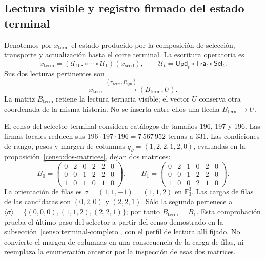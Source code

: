 



\subsection{Lectura visible y registro firmado del estado terminal}
\label{subsec:k-terminal}

Denotemos por \(x_{\mathrm{term}}\) el estado producido por la composición
de selección, transporte y actualización hasta el corte terminal. La
escritura operatoria es
\[
 x_{\mathrm{term}}=
 (\mathcal U_{108}\circ\cdots\circ\mathcal U_1)(x_{\mathrm{seed}}),
 \qquad \mathcal U_t=\mathsf{Upd}_t\circ\mathsf{Tra}_t\circ\mathsf{Sel}_t.
\]
Sus dos lecturas pertinentes son
\[
 x_{\mathrm{term}}
 \xrightarrow{(\pi_{\mathrm{term}},R_{\mathrm{sgn}})}
 (B_{\mathrm{term}},U).
\]
La matriz \(B_{\mathrm{term}}\) retiene la lectura ternaria visible; el
vector \(U\) conserva otra coordenada de la misma historia. No se inserta
entre ellos una flecha \(B_{\mathrm{term}}\to U\).

El censo del selector terminal considera catálogos
de tamaños 196, 197 y 196. Las firmas locales reducen sus
\(196\cdot197\cdot196=7\,567\,952\) ternas a 331. Las condiciones de rango,
pesos y margen de columnas \(q_{\partial}=(1,2,2,1,2,0)\),
evaluadas en la proposición~\ref{censo:dos-matrices}, dejan dos matrices:
\[
 B_0=\begin{pmatrix}0&2&0&2&2&0\\0&0&1&2&2&0\\1&0&1&0&1&0\end{pmatrix},
 \qquad
 B_1=\begin{pmatrix}0&2&1&0&2&0\\0&0&1&2&2&0\\1&0&0&2&1&0\end{pmatrix}.
\]
La orientación de filas es \(\sigma=(1,1,-1)=(1,1,2)\) en
\(\mathbb F_3^3\). Las cargas de filas de las candidatas son
\((0,2,0)\) y \((2,2,1)\). Sólo la segunda pertenece a
\(\langle\sigma\rangle=\{(0,0,0),(1,1,2),(2,2,1)\}\); por tanto
\(B_{\mathrm{term}}=B_1\). Esta comprobación prueba el último paso del
selector a partir del censo demostrado en la
subsección~\ref{censo:terminal-completo}, con el perfil de lectura allí fijado.
No convierte el margen de columnas
en una consecuencia de la carga de filas, ni reemplaza la enumeración
anterior por la inspección de esas dos matrices.

